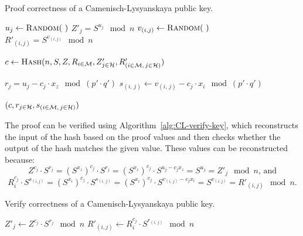 \begin{algorithm}
  \caption{Proof correctness of a Camenisch-Lysyanskaya public key.}
  \label{alg:CL-prove-key}
  \addtolength{\baselineskip}{1mm}
  \begin{algorithmic}[1]
        \State $u_j \gets \Call{Random}{~}$
        \State $Z'_j = S^{u_j} \mod n$
          \State $v_{(i,j)} \gets \Call{Random}{~}$
          \State $R'_{(i,j)} = S^{v_{(i,j)}} \mod n$
        \EndFor
      \EndFor

      \State $c \gets \Call{Hash}{n, S, Z, R_{i \in \M}, Z'_{j \in \mathcal{H}}, R'_{(i \in \M,\, j \in \mathcal{H})}}$

        \State $r_j = u_j - c_j \cdot x_z \mod (p' \cdot q')$
          \State $s_{(i,\, j)} \gets v_{(i,\, j)} - c_j \cdot x_i \mod (p' \cdot q')$
        \EndFor
      \EndFor

      \Return $(c, r_{j \in \mathcal{H}}, s_{(i \in \mathcal{M},\, j \in \mathcal{H})})$
    \EndFunction
  \end{algorithmic}
\end{algorithm}

The proof can be verified using Algorithm~\ref{alg:CL-verify-key}, which
reconstructs the input of the hash based on the proof values and then checks
whether the output of the hash matches the given value. These values can be
reconstructed because:
\begin{equation*}
  Z^{c_j} \cdot S^{r_j}
  = (S^{x_z})^{c_j} \cdot S^{r_j}
  = (S^{x_z})^{c_j} \cdot S^{u_j - c_j x_z}
  = S^{u_j}
  = Z'_j \mod n \text{, and}
\end{equation*}
\begin{equation*}
  R_i^{c_j} \cdot S^{s_{(i,j)}}
  = (S^{x_i})^{c_j} \cdot S^{s_{(i,\, j)}}
  = (S^{x_i})^{c_j} \cdot S^{v_{(i,\, j)}-c_j x_i}
  = S^{v_{(i,j)}}
  = R'_{(i,j)} \mod n \text{.}
\end{equation*}

\begin{algorithm}
  \caption{Verify correctness of a Camenisch-Lysyanskaya public key.}
  \label{alg:CL-verify-key}
  \addtolength{\baselineskip}{1mm}
  \begin{algorithmic}[1]
        \State $Z'_j \gets Z^{c_j} \cdot S^{r_j} \mod n$
          \State $R'_{(i,j)} \gets R_i^{c_j} \cdot S^{r_{(i,\, j)}} \mod n$
        \EndFor
      \EndFor

        \Return {}
      \EndIf

      \Return {}
    \EndFunction
  \end{algorithmic}
\end{algorithm}


